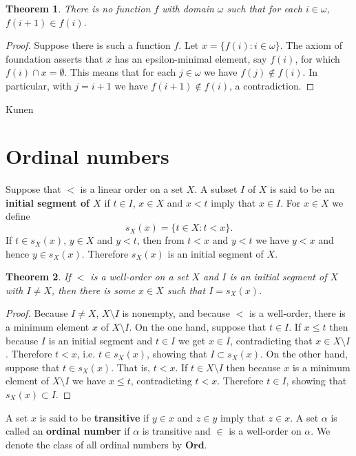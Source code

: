 \documentclass{article}
\newtheorem{theorem}{Theorem}
\theoremstyle{definition}
\begin{document}
\begin{theorem}
There is no function $f$ with domain $\omega$ such that for each $i \in \omega$, 
$f(i+1) \in f(i)$.
\end{theorem}
\begin{proof}
Suppose there is such a function $f$. 
Let $x = \{f(i): i \in \omega\}$. 
The axiom of foundation asserts that $x$ has an epsilon-minimal element, say $f(i)$, for which $f(i) \cap x = \emptyset$. 
This means that for each $j \in \omega$ we have $f(j) \not \in f(i)$. In particular, with $j=i+1$ we have
$f(i+1) \not \in f(i)$, a contradiction. 
\end{proof}

Kunen \cite{kunen}


\section{Ordinal numbers}
Suppose that $<$ is a linear order on a set $X$. A subset $I$ of $X$ is said to be an \textbf{initial segment of $X$}
if $t \in I$, $x \in X$ and $x<t$ imply that $x \in I$. For $x \in X$ we define
\[
s_X(x) = \{t \in X: t < x\}.
\] 
If $t \in s_X(x)$, $y \in X$ and $y<t$, then from $t<x$ and $y<t$ we have $y<x$ and hence
$y \in s_X(x)$. Therefore $s_X(x)$ is an initial segment of $X$.

\begin{theorem}
If $<$ is a well-order on a set $X$ and $I$ is an initial segment of $X$ with $I \neq X$, then there is some $x \in X$ such that
$I=s_X(x)$.
\end{theorem}
\begin{proof}
Because $I \neq X$,
$X \setminus I$ is nonempty, and because $<$ is a well-order, there is a minimum element $x$ of $X \setminus I$. On the one hand, suppose that
$t \in I$. If $x \leq t$ then because $I$ is an initial segment and $t \in I$ we get $x \in I$, contradicting that $x \in X \setminus I$.
Therefore $t<x$, i.e. $t \in s_X(x)$, showing that $I \subset s_X(x)$. 
On the other hand, suppose that $t \in s_X(x)$. That is, $t < x$.
If $t \in X \setminus I$ then because $x$ is a minimum element of $X \setminus I$ we have 
$x \leq t$, contradicting $t<x$. Therefore $t \in I$, showing that $s_X(x) \subset I$.
\end{proof}

A set $x$ is said to be \textbf{transitive} if $y \in x$ and $z \in y$ imply that $z \in x$. 
A set $\alpha$ is called an \textbf{ordinal number} if $\alpha$ is transitive and $\in$ is a well-order on $\alpha$. 
We denote the class of all ordinal numbers by 
$\mathbf{Ord}$. 
\end{document}
